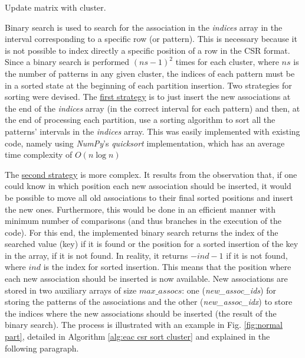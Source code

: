 \begin{algorithm}
\caption{Update matrix with cluster.}\label{alg:eac csr update cluster}
\begin{algorithmic}[1]
		\Else
            \EndIf
		\EndIf
	\EndFor
\EndFor
\EndProcedure
\end{algorithmic}
\end{algorithm}

Binary search is used to search for the association in the \emph{indices} array in the interval corresponding to a specific row (or pattern).
This is necessary because it is not possible to index directly a specific position of a row in the CSR format.
Since a binary search is performed $(ns - 1)^2$ times for each cluster, where $ns$ is the number of patterns in any given cluster, the indices of each pattern must be in a sorted state at the beginning of each partition insertion.
Two strategies for sorting were devised.
The \underline{first strategy} is to just insert the new associations at the end of the \emph{indices} array (in the correct interval for each pattern) and then, at the end of processing each partition, use a sorting algorithm to sort all the patterns' intervals in the \emph{indices} array.
This was easily implemented with existing code, namely using \emph{NumPy}'s \emph{quicksort} implementation, which has an average time complexity of $O(n \log n)$

The \underline{second strategy} is more complex.
It results from the observation that, if one could know in which position each new association should be inserted, it would be possible to move all old associations to their final sorted positions and insert the new ones.
Furthermore, this would be done in an efficient manner with minimum number of comparisons (and thus branches in the execution of the code).
For this end, the implemented binary search returns the index of the searched value (key) if it is found or the position for a sorted insertion of the key in the array, if it is not found.
In reality, it returns $-ind -1$ if it is not found, where $ind$ is the index for sorted insertion.
This means that the position where each new association should be inserted is now available.
New associations are stored in two auxiliary arrays of size $max\_assocs$: one (\emph{new\_assoc\_ids}) for storing the patterns of the associations and the other (\emph{new\_assoc\_idx}) to store the indices where the new associations should be inserted (the result of the binary search).
The process is illustrated with an example in Fig. \ref{fig:normal part}, detailed in Algorithm \ref{alg:eac csr sort cluster} and explained in the following paragraph.

